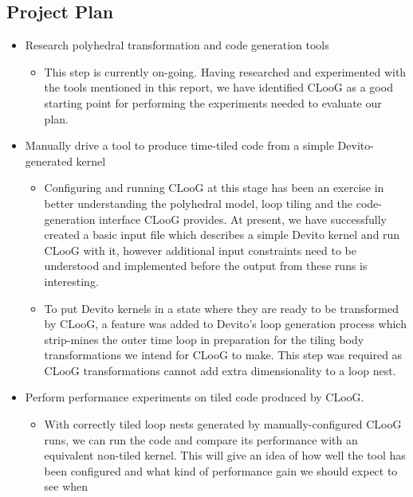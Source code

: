 \documentclass[a4paper,12pt,twoside]{report}
\begin{document}
\begin{itemize}
\chapter{Project Plan}
\begin{itemize}
    \item Research polyhedral transformation and code generation tools
        \begin{itemize}
            \item This step is currently on-going. Having researched and experimented with the tools mentioned in
                this report, we have identified CLooG as a good starting point for performing the experiments needed
                to evaluate our plan.
        \end{itemize}
    \item Manually drive a tool to produce time-tiled code from a simple Devito-generated kernel
        \begin{itemize}
            \item Configuring and running CLooG at this stage has been an exercise in better understanding the polyhedral model,
                loop tiling and the code-generation interface CLooG provides. At present, we have successfully created a basic input file
                which describes a simple Devito kernel and run CLooG with it, however additional input constraints need to be understood and implemented
                before the output from these runs is interesting.
            \item To put Devito kernels in a state where they are ready to be transformed by CLooG, a feature was added to Devito's loop generation process
                which strip-mines the outer time loop in preparation for the tiling body transformations we intend for CLooG to make. This step was required as CLooG
                transformations cannot add extra dimensionality to a loop nest.
        \end{itemize}
    \item Perform performance experiments on tiled code produced by CLooG.
        \begin{itemize}
            \item With correctly tiled loop nests generated by manually-configured CLooG runs, we can run the code and compare its performance with an equivalent 
                non-tiled kernel. This will give an idea of how well the tool has been configured and what kind of performance gain we should expect to see when

\end{itemize}
\end{itemize}
\end{itemize}
\end{document}
